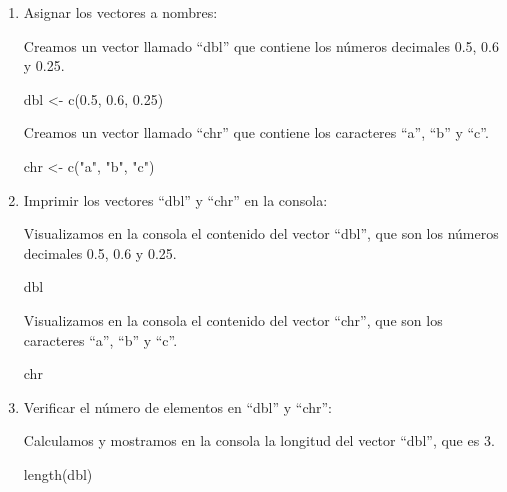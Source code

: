 \documentclass[
  jou,
  floatsintext,
  longtable,
  a4paper,
  nolmodern,
  notxfonts,
  notimes,
  colorlinks=true,linkcolor=blue,citecolor=blue,urlcolor=blue]{apa7}
\newenvironment{Shaded}{\begin{snugshade}}{\end{snugshade}}
\newcommand{\FloatTok}[1]{\textcolor[rgb]{0.68,0.00,0.00}{#1}}
\newcommand{\FunctionTok}[1]{\textcolor[rgb]{0.28,0.35,0.67}{#1}}
\newcommand{\NormalTok}[1]{\textcolor[rgb]{0.00,0.23,0.31}{#1}}
\newcommand{\OtherTok}[1]{\textcolor[rgb]{0.00,0.23,0.31}{#1}}
\newcommand{\StringTok}[1]{\textcolor[rgb]{0.13,0.47,0.30}{#1}}
\begin{document}
\begin{enumerate}
\def\labelenumi{\arabic{enumi}.}
\item
  Asignar los vectores a nombres:

  Creamos un vector llamado ``dbl'' que contiene los números decimales
  0.5, 0.6 y 0.25.

\begin{Shaded}
\begin{Highlighting}[]
\NormalTok{dbl }\OtherTok{\textless{}{-}} \FunctionTok{c}\NormalTok{(}\FloatTok{0.5}\NormalTok{, }\FloatTok{0.6}\NormalTok{, }\FloatTok{0.25}\NormalTok{)}
\end{Highlighting}
\end{Shaded}

  Creamos un vector llamado ``chr'' que contiene los caracteres ``a'',
  ``b'' y ``c''.

\begin{Shaded}
\begin{Highlighting}[]
\NormalTok{chr }\OtherTok{\textless{}{-}} \FunctionTok{c}\NormalTok{(}\StringTok{"a"}\NormalTok{, }\StringTok{"b"}\NormalTok{, }\StringTok{"c"}\NormalTok{)}
\end{Highlighting}
\end{Shaded}
\item
  Imprimir los vectores ``dbl'' y ``chr'' en la consola:

  Visualizamos en la consola el contenido del vector ``dbl'', que son
  los números decimales 0.5, 0.6 y 0.25.

\begin{Shaded}
\begin{Highlighting}[]
\NormalTok{dbl}
\end{Highlighting}
\end{Shaded}

  Visualizamos en la consola el contenido del vector ``chr'', que son
  los caracteres ``a'', ``b'' y ``c''.

\begin{Shaded}
\begin{Highlighting}[]
\NormalTok{chr}
\end{Highlighting}
\end{Shaded}
\item
  Verificar el número de elementos en ``dbl'' y ``chr'':

  Calculamos y mostramos en la consola la longitud del vector ``dbl'',
  que es 3.

\begin{Shaded}
\begin{Highlighting}[]
\FunctionTok{length}\NormalTok{(dbl)}
\end{Highlighting}
\end{Shaded}


\end{enumerate}
\end{document}
